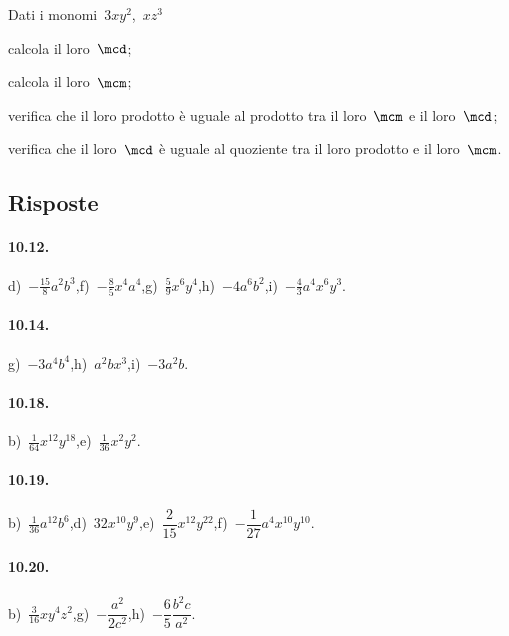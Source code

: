 \begin{esercizio}
 \label{ese:10.50} %
Dati i monomi~$3xy^{2}$,\, $xz^{3}$

\begin{enumeratea}
\item calcola il loro~$\mcd$;
\item calcola il loro~$\mcm$;
\item verifica che il loro prodotto è uguale al prodotto tra il loro~$\mcm$ e il loro~$\mcd$;
\item verifica che il loro~$\mcd$ è uguale al quoziente tra il loro prodotto e il loro~$\mcm$.
\end{enumeratea}
\end{esercizio}

\subsection{Risposte}

\paragraph{10.12.} d)~$-\frac{15}{8}a^{2}b^{3}$,\quad f)~$-\frac{8}{5}x^{4}a^{4}$,\quad g)~$\frac{5}{9}x^{6}y^{4}$,\quad h)~$-4a^{6}b^{2}$,\quad i)~$-\frac{4}{3}a^{4}x^{6}y^{3}$.

\paragraph{10.14.} g)~$-3a^{4}b^{4}$,\quad h)~$a^{2}bx^{3}$,\quad i)~$-3a^{2}b$.

\paragraph{10.18.} b)~$\frac{1}{64}x^{12}y^{18}$,\quad e)~$\frac{1}{36}x^{2}y^{2}$.

\paragraph{10.19.} b)~$\frac{1}{36}a^{12}b^{6}$,\quad d)~$32x^{10}y^{9}$,\quad e)~$\dfrac{2}{15}x^{12}y^{22}$,\quad f)~$-\dfrac{1}{27}a^{4}x^{10}y^{10}$.

\paragraph{10.20.} b)~$\frac{3}{16}xy^{4}z^{2}$,\quad g)~$-\dfrac{a^2}{2c^2}$,\quad h)~$-\dfrac{6}{5}\dfrac{b^2c}{a^2}$.

